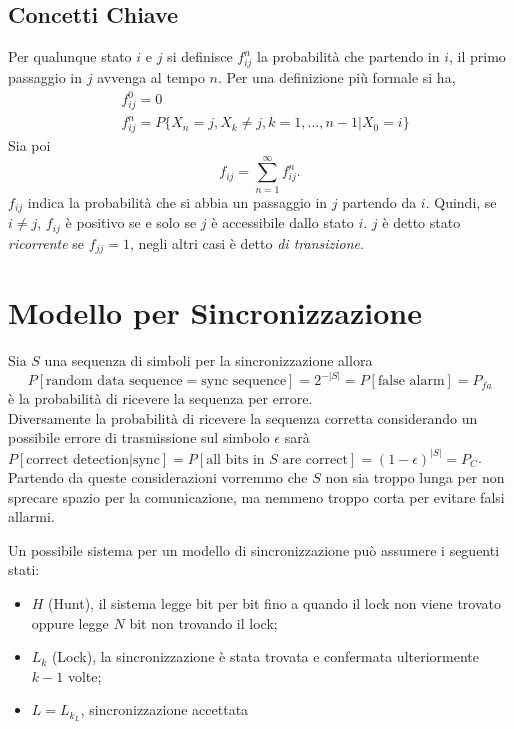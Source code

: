 \documentclass{article}
\begin{document}
\subsection{Concetti Chiave}
Per qualunque stato $i$ e $j$ si definisce $f_{ij}^n$ la probabilità che partendo in $i$, il primo passaggio in $j$ avvenga al tempo $n$. Per una definizione più formale si ha,
\begin{align*}
& f_{ij}^0 = 0\\
& f_{ij}^n = P\{X_n = j, X_k \neq j, k = 1,...,n-1 | X_0 = i\}
\end{align*}
Sia poi
\[
    f_{ij} = \sum_{n = 1}^{\infty} f_{ij}^n.
\]
$f_{ij}$ indica la probabilità che si abbia un passaggio in $j$ partendo da $i$. Quindi, se $i \neq j$, $f_{ij}$ è positivo se e solo se $j$ è accessibile dallo stato $i$. $j$ è detto stato \textit{ricorrente} se $f_{jj} = 1$, negli altri casi è detto \textit{di transizione}.  


\section{Modello per Sincronizzazione}

Sia $S$ una sequenza di simboli per la sincronizzazione allora
\[P[\text{random data sequence} = \text{sync sequence}] = 2^{-\left|S\right|} = P[\text{false alarm}] = P_{fa} \]
è la probabilità di ricevere la sequenza per errore.\\

Diversamente la probabilità di ricevere la sequenza corretta considerando un possibile errore di trasmissione sul simbolo $\epsilon$ sarà \begin{math} P[\text{correct detection} | \text{sync}] = P[\text{all bits in $S$ are correct}] = (1 - \epsilon)^{\left|S\right|} = P_C\end{math}.\\

Partendo da queste considerazioni vorremmo che $S$ non sia troppo lunga per non sprecare spazio per la comunicazione, ma nemmeno troppo corta per evitare falsi allarmi.

Un possibile sistema per un modello di sincronizzazione può assumere i seguenti stati:
\begin{itemize}
    \item $H$ (Hunt), il sistema legge bit per bit fino a quando il lock non viene trovato oppure legge $N$ bit non trovando il lock;
    \item $L_k$ (Lock), la sincronizzazione è stata trovata e confermata ulteriormente $k-1$ volte;
    \item $L = L_{k_L}$, sincronizzazione accettata
\end{itemize}
\end{document}
